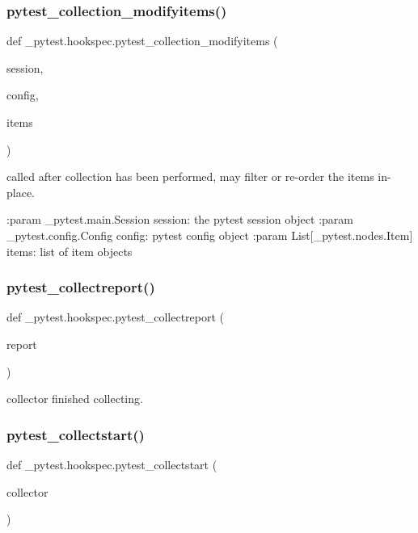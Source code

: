 \subsubsection{\texorpdfstring{pytest\+\_\+collection\+\_\+modifyitems()}{pytest\_collection\_modifyitems()}}
{\footnotesize\ttfamily def \+\_\+pytest.\+hookspec.\+pytest\+\_\+collection\+\_\+modifyitems (\begin{DoxyParamCaption}\item[{}]{session,  }\item[{}]{config,  }\item[{}]{items }\end{DoxyParamCaption})}

\begin{DoxyVerb}called after collection has been performed, may filter or re-order
the items in-place.

:param _pytest.main.Session session: the pytest session object
:param _pytest.config.Config config: pytest config object
:param List[_pytest.nodes.Item] items: list of item objects
\end{DoxyVerb}
 \mbox{\label{namespace__pytest_1_1hookspec_ab461cccb10d98c6e51b79ced9306e764}} 
\subsubsection{\texorpdfstring{pytest\+\_\+collectreport()}{pytest\_collectreport()}}
{\footnotesize\ttfamily def \+\_\+pytest.\+hookspec.\+pytest\+\_\+collectreport (\begin{DoxyParamCaption}\item[{}]{report }\end{DoxyParamCaption})}

\begin{DoxyVerb}collector finished collecting. \end{DoxyVerb}
 \mbox{\label{namespace__pytest_1_1hookspec_a12d78e4930cbe75b1f10a8d666097531}} 
\subsubsection{\texorpdfstring{pytest\+\_\+collectstart()}{pytest\_collectstart()}}
{\footnotesize\ttfamily def \+\_\+pytest.\+hookspec.\+pytest\+\_\+collectstart (\begin{DoxyParamCaption}\item[{}]{collector }\end{DoxyParamCaption})}


